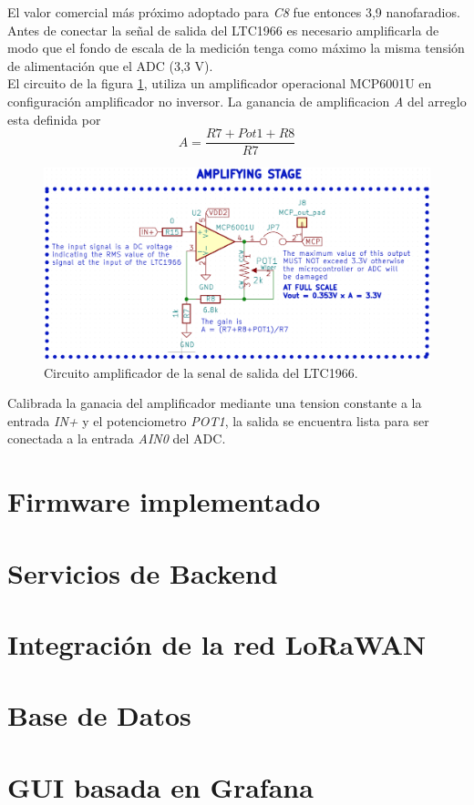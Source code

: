 El valor comercial más próximo adoptado para \textit{C8} fue entonces 3,9 nanofaradios.\\
Antes de conectar la señal de salida del LTC1966 es necesario amplificarla de modo que el fondo de escala de la medición tenga como máximo la misma tensión de alimentación que el ADC (3,3 V).\\
El circuito de la figura \ref{fig:ctoopamp}, utiliza un amplificador operacional MCP6001U \citep{mcp6001} en configuración amplificador no inversor. La ganancia de amplificacion \textit{A} del arreglo esta definida por
\begin{equation}
	A=\frac{R7+Pot1+R8}{R7}
\end{equation}

\begin{figure}[h!]
	\centering
	\includegraphics[width=0.7\linewidth]{Figures/cto_op_amp}
	\caption{Circuito amplificador de la senal de salida del LTC1966.}
	\label{fig:ctoopamp}
\end{figure}
Calibrada la ganacia del amplificador mediante una tension constante a la entrada \textit{IN+} y el potenciometro \textit{POT1}, la salida se encuentra lista para ser conectada a la entrada \textit{AIN0} del ADC.\\


\section{Firmware implementado}
\label{seccion_firmware}

\section{Servicios de Backend}
\label{seccion_bes}

\section{Integraci\'{o}n de la red LoRaWAN}

\section{Base de Datos}

\section{GUI basada en Grafana}

